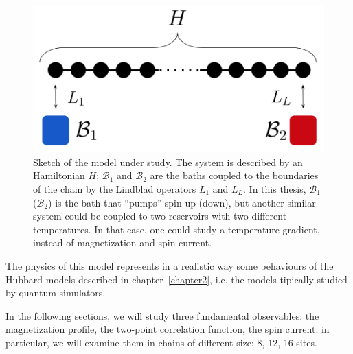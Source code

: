 \begin{figure}[H]
    \centering
    \includegraphics[scale=0.7]{Figures/sketch_model.png}
    \captionsetup{width=1.\linewidth}
    \caption{Sketch of the model under study. The system is described by an Hamiltonian $H$; $\mathcal{B}_1$ and $\mathcal{B}_2$ are the baths coupled to the boundaries of the chain by the Lindblad operators $L_1$ and $L_L$. In this thesis, $\mathcal{B}_1$ ($\mathcal{B}_2$) is the bath that ``pumps'' spin up (down), but another similar system could be coupled to two reservoirs with two different temperatures. In that case, one could study a temperature gradient, instead of magnetization and spin current.}
    \label{fig:sketch_model}
\end{figure}


The physics of this model represents in a realistic way some behaviours of the Hubbard models described in chapter~\ref{chapter2}, i.e. the models tipically studied by quantum simulators.

In the following sections, we will study three fundamental observables: the magnetization profile, the two-point correlation function, the spin current; in particular, we will examine them in chains of different size: 8, 12, 16 sites. 

